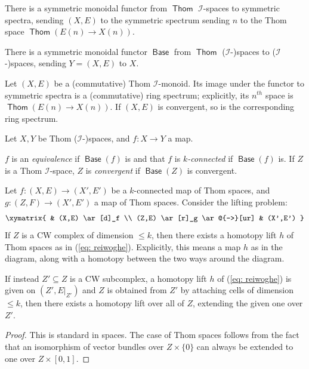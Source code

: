 \documentclass{TPmod}
\DeclareMathOperator{\Thom}{\mathsf{Thom}}
\DeclareMathOperator{\Base}{\mathsf{Base}}
\newcommand{\cI}{\mathcal{I}}
\numberwithin{equation}{section}
\begin{document}
    
    \begin{defn}\label{def: thom from thom}
        There is a symmetric monoidal functor from $\Thom$ $\cI$-spaces to symmetric spectra, sending $(X,E)$ to the symmetric spectrum sending $n$ to the Thom space $\Thom(E(n) \to X(n))$.

        There is a symmetric monoidal functor $\Base$ from $\Thom$ ($\cI$-)spaces to ($\cI$-)spaces, sending $Y=(X, E)$ to $X$.
    \end{defn}
    \begin{rmk}\label{rmk: comm thom ring spec}
        Let $(X, E)$ be a (commutative) Thom $\cI$-monoid. Its image under the functor to symmetric spectra is a (commutative) ring spectrum; explicitly, its $n^{th}$ space is $\Thom(E(n) \to X(n))$. If $(X, E)$ is convergent, so is the corresponding ring spectrum.
    \end{rmk}
    \begin{defn}
        Let $X, Y$ be Thom ($\cI$-)spaces, and $f: X \to Y$ a map.

        $f$ is an \emph{equivalence} if $\Base(f)$ is and that $f$ is \emph{$k$-connected} if $\Base(f)$ is. If $Z$ is a Thom $\cI$-space, $Z$ is \emph{convergent} if $\Base(Z)$ is convergent.
    
    \end{defn}
    

    \begin{lem}
        Let $f: (X, E) \to (X', E')$ be a $k$-connected map of Thom spaces, and $g: (Z, F) \to (X', E')$ a map of Thom spaces. Consider the lifting problem:
        \begin{equation}\label{eq: reiwoghe}
            \xymatrix{
                &
                (X,E)
                \ar[d]_f
                \\
                (Z,E)
                \ar[r]_g
                \ar@{-->}[ur]
                &
                (X',E')
            }
        \end{equation}
        If $Z$ is a CW complex of dimension $\leq k$, then there exists a homotopy lift $h$ of Thom spaces as in (\ref{eq: reiwoghe}). Explicitly, this means a map $h$ as in the diagram, along with a homotopy between the two ways around the diagram.

        If instead $Z' \subseteq Z$ is a CW subcomplex, a homotopy lift $h$ of (\ref{eq: reiwoghe}) is given on $(Z', E|_{Z'})$ and $Z$ is obtained from $Z'$ by attaching cells of dimension $\leq k$, then there exists a homotopy lift over all of $Z$, extending the given one over $Z'$.
    \end{lem}
    \begin{proof}
        This is standard in spaces. The case of Thom spaces follows from the fact that an isomorphism of vector bundles over $Z \times \{0\}$ can always be extended to one over $Z \times [0,1]$.
    \end{proof}
\end{document}
